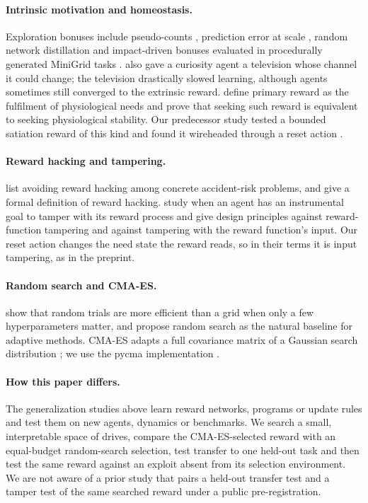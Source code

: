 \documentclass[11pt,letterpaper]{article}
\begin{document}
\paragraph{Intrinsic motivation and homeostasis.} Exploration bonuses include pseudo-counts
\citep{bellemare2016unifying}, prediction error at scale \citep{burda2019largescale}, random network distillation
\citep{burda2019rnd} and impact-driven bonuses evaluated in procedurally generated MiniGrid tasks
\citep{raileanu2020ride}. \citet{burda2019largescale} also gave a curiosity agent a television whose channel it
could change; the television drastically slowed learning, although agents sometimes still converged to the
extrinsic reward. \citet{keramati2014homeostatic} define primary reward as the fulfilment of physiological needs and prove
that seeking such reward is equivalent to seeking physiological stability. Our predecessor study tested a bounded satiation reward of
this kind and found it wireheaded through a reset action \citep{metoyer2026satisfied}.

\paragraph{Reward hacking and tampering.} \citet{amodei2016concrete} list avoiding reward hacking among concrete
accident-risk problems, and \citet{skalse2022defining} give a formal definition of reward hacking. \citet{everitt2021reward}
study when an agent has an instrumental goal to tamper with its reward process and give design principles against
reward-function tampering and against tampering with the reward function's input. Our reset action changes the
need state the reward reads, so in their terms it is input tampering, as in the preprint.

\paragraph{Random search and CMA-ES.} \citet{bergstra2012random} show that random trials are more efficient than a
grid when only a few hyperparameters matter, and propose random search as the natural baseline for adaptive
methods. CMA-ES adapts a full covariance matrix of a Gaussian search distribution
\citep{hansen2001completely,hansen2016cma}; we use the pycma implementation \citep{hansen2026pycma}.

\paragraph{How this paper differs.} The generalization studies above learn reward networks, programs or update rules
and test them on new agents, dynamics or benchmarks. We search a small, interpretable space of drives, compare the
CMA-ES-selected reward with an equal-budget random-search selection, test transfer to one held-out task and then test
the same reward against an exploit absent from its selection environment. We are not aware of a prior study that
pairs a held-out transfer test and a tamper test of the same searched reward under a public pre-registration.
\end{document}
